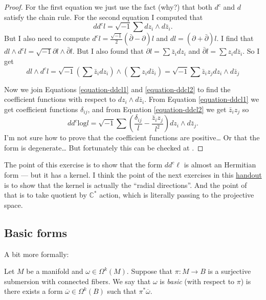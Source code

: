 \begin{proof}
For the first equation we just use the fact
(why?) that both $d^c$ and $d$ satisfy the
chain rule.
For the second equation I computed that
\begin{equation}
\label{equation-ddcl1}
dd^cl=\sqrt{-1}\sum dz_i\wedge d\bar{z}_i.
\end{equation}
But I also need to compute
$d^cl=\frac{\sqrt{-1}}{2}(\bar\partial-
\partial)l$
and $dl=(\partial+\bar\partial)l$.
I find that $dl \wedge d^cl=\sqrt{-1}\partial
l \wedge \bar\partial l$.
But I also found that
$\partial l=\sum \bar{z}_idz_i$ and
$\bar\partial l=\sum z_i d\bar{z}_i$.
So I get
\begin{equation}
\label{equation-ddcl2}
dl\wedge d^cl=\sqrt{-1}
\left(\sum \bar{z}_i dz_i\right)
\wedge
\left(\sum z_i d \bar{z}_i\right)
=\sqrt{-1}\sum\bar{z}_iz_jdz_i\wedge
d\bar{z}_j
\end{equation}

\noindent
Now we join Equations \ref{equation-ddcl1}
and \ref{equation-ddcl2}
to find the coefficient functions with
respect to $dz_i \wedge d\bar{z}_i$.
From Equation \ref{equation-ddcl1} we get
coefficient functions $\delta_{ij}$,
and from Equation \ref{equation-ddcl2} we get
$\bar{z}_iz_j$ so
$$
dd^c\text{log}l=\sqrt{-1}\sum
\left(\frac{\delta_{ij}}{l}
-\frac{\bar{z}_iz_j}{l^2}\right)
dz_i \wedge d\bar{z}_j.
$$
I'm not sure how to prove that  the
coefficient functions
are positive… Or that the form is degenerate…
But fortunately this can be checked at
\cite[p. 118]{huc}.
\end{proof}

\noindent
The point of this exercise is to show that
the form
$dd^c\ell$ is almost an Hermitian form ---
but it has a kernel.
I think the point of the next exercises in
this
\href{http://verbit.ru/IMPA/Surfaces-2025/%
assign-surfaces-2025-04.pdf}{
handout}
is to show that the kernel is actually
the ``radial directions''.
And the point of that is to take quotient
by $\mathbb{C}^*$ action, which is literally
passing to the projective space.

\subsection{Basic forms}
\label{subsection-basic-forms}

A bit more formally:

\begin{definition}
\label{definition-basic-form}
Let $M$ be a manifold and $\omega \in
\Omega^k(M)$.
Suppose that $\pi:M \to B$ is a surjective
submersion with connected fibers.
We say that $\omega$ is {\it basic} (with
respect
to $\pi$) is there exists a form
$\overline{\omega}\in \Omega^k(B)$ such that
$\pi^*  \overline{\omega}$.
\end{definition}

